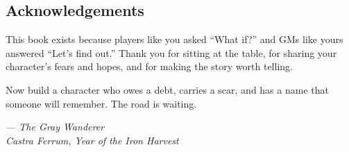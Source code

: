 \subsection*{Acknowledgements}

This book exists because players like you asked ``What if?'' and GMs like yours answered ``Let's find out.'' Thank you for sitting at the table, for sharing your character's fears and hopes, and for making the story worth telling.

Now build a character who owes a debt, carries a scar, and has a name that someone will remember. The road is waiting.

\vspace{1em}
\noindent\textit{--- The Gray Wanderer} \\
\textit{Castra Ferrum, Year of the Iron Harvest}